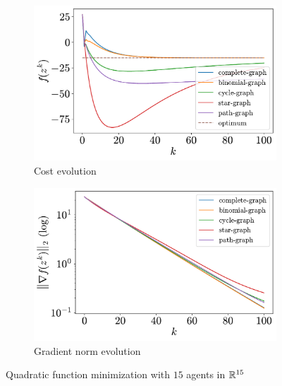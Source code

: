 \documentclass[a4paper,11pt,oneside]{book}
\begin{document}
\begin{figure}[htb!]
      \centering
      \begin{subfigure}[t]{0.46\linewidth}
            \centering
            \includegraphics[width=\linewidth]{./figs/quadratic/15_15_100/cost.pdf} 
            \caption{Cost evolution}
      \end{subfigure}
      \hfill
      \begin{subfigure}[t]{0.46\linewidth}
            \centering
            \includegraphics[width=\linewidth]{./figs/quadratic/15_15_100/gradient.pdf} 
            \caption{Gradient norm evolution}
      \end{subfigure}
      \caption{Quadratic function minimization with $15$ agents in ${\mathbb{R}}^{15}$}
      \label{fig:quadratic_15_15}
\end{figure}
\end{document}
